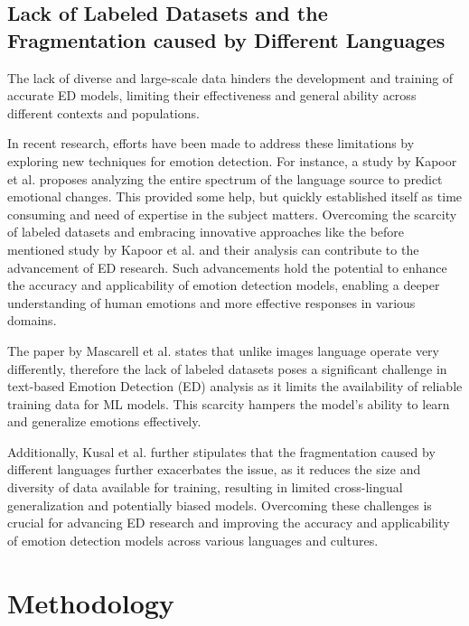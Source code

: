\documentclass[11pt]{article}
\begin{document}
\subsection{Lack of Labeled Datasets and the Fragmentation caused by Different Languages}

The lack of diverse and large-scale data hinders the development and training of accurate ED models, limiting their effectiveness and general ability across different contexts and populations.

In recent research, efforts have been made to address these limitations by exploring new techniques for emotion detection. For instance, a study by Kapoor\cite{KAPOOR2023120882} et al. proposes analyzing the entire spectrum of the language source to predict emotional changes. This provided some help, but quickly established itself as time consuming and need of expertise in the subject matters. Overcoming the scarcity of labeled datasets and embracing innovative approaches like the before mentioned study by Kapoor\cite{KAPOOR2023120882} et al. and their analysis can contribute to the advancement of ED research. Such advancements hold the potential to enhance the accuracy and applicability of emotion detection models, enabling a deeper understanding of human emotions and more effective responses in various domains.

The paper by Mascarell\cite{mascarell-etal-2021-stance} et al. states that unlike images language operate very differently, therefore the lack of labeled datasets poses a significant challenge in text-based Emotion Detection (ED) analysis as it limits the availability of reliable training data for ML models. This scarcity hampers the model's ability to learn and generalize emotions effectively.

Additionally, Kusal et al. further stipulates \cite{kusal} that the fragmentation caused by different languages further exacerbates the issue, as it reduces the size and diversity of data available for training, resulting in limited cross-lingual generalization and potentially biased models. Overcoming these challenges is crucial for advancing ED research and improving the accuracy and applicability of emotion detection models across various languages and cultures.

\section{Methodology}
\end{document}
